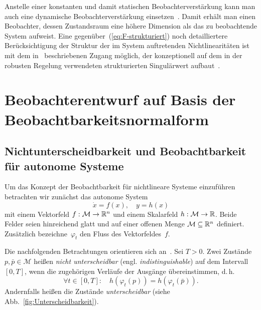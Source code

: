 \begin{remark}
Anstelle einer konstanten und damit statischen Beobachterverstärkung
kann man auch eine dynamische Beobachterverstärkung einsetzen~\cite{pertew2005ifac,pertew2006}.
Damit erhält man einen Beobachter, dessen Zustandsraum eine höhere
Dimension als das zu beobachtende System aufweist. Eine gegenüber~(\ref{eq:F-strukturiert})
noch detailliertere Berücksichtigung der Struktur der im System auftretenden
Nichtlinearitäten ist mit dem in~\cite{franke2016pamm} beschriebenen
Zugang möglich, der konzeptionell auf dem in der robusten Regelung
verwendeten strukturierten Singulärwert aufbaut~\cite[Kap.~10]{zhou1998}.
\end{remark}

\section{Beobachterentwurf auf Basis der Beobachtbarkeitsnormalform\label{sec:High-Gain-Entwurf-Beobachtbarkeitsnormalform}}

\subsection{Nichtunterscheidbarkeit und Beobachtbarkeit für autonome Systeme\label{subsec:Beobachtbarkeit-autonom}}

Um das Konzept der Beobachtbarkeit für nichtlineare Systeme einzuführen
betrachten wir zunächst das autonome System 
\begin{equation}
\dot{x}=f(x),\quad y=h(x)\label{eq:hg-system-autonom}
\end{equation}
mit einem Vektorfeld $f:\mathcal{M}\to{\mathbb{R}}^{n}$ und einem Skalarfeld
$h:\mathcal{M}\to{\mathbb{R}}$. Beide Felder seien hinreichend glatt und auf
einer offenen Menge $\mathcal{M}\subseteq{\mathbb{R}}^{n}$ definiert. Zusätzlich
bezeichne~$\varphi_{t}$ den Fluss des Vektorfeldes~$f$.

Die nachfolgenden Betrachtungen orientieren sich an~\cite{hermann1977}.
Sei $T>0$. Zwei Zustände $p,\bar{p}\in\mathcal{M}$ heißen \emph{nicht
unterscheidbar} (engl. \emph{indistinguishable})
auf dem Intervall $[0,T]$, wenn die zugehörigen Verläufe der Ausgänge
übereinstimmen, d.\,h.
\begin{equation}
\forall t\in[0,T]:\quad h(\varphi_{t}(p))=h(\varphi_{t}(\bar{p})).\label{eq:Nichtunterscheidbarkeit}
\end{equation}
Andernfalls heißen die Zustände \emph{unterscheidbar} (siehe Abb.~\ref{fig:Unterscheidbarkeit}).

